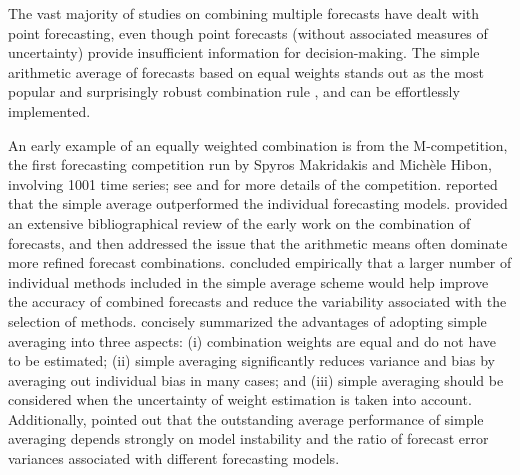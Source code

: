 \documentclass[a4paper,11pt]{article}
\begin{document}
The vast majority of studies on combining multiple forecasts have dealt with point forecasting, even though point forecasts (without associated measures of uncertainty) provide insufficient information for decision-making. The simple arithmetic average of forecasts based on equal weights stands out as the most popular and surprisingly robust combination rule \citep[see][]{Bunn1985-vo,Clemen1986-pd,Stock2003-sp,Genre2013-ut}, and can be effortlessly implemented.

An early example of an equally weighted combination is from the M-competition, the first forecasting competition run by Spyros Makridakis and Mich{\`e}le Hibon, involving 1001 time series; see \citet{Makridakis1982-hb} and \citet{Hyndman2020-bh} for more details of the competition. \citet{Makridakis1982-hb} reported that the simple average outperformed the individual forecasting models. \citet{Clemen1989-fb} provided an extensive bibliographical review of the early work on the combination of forecasts, and then addressed the issue that the arithmetic means often dominate more refined forecast combinations. \citet{Makridakis1983-hg} concluded empirically that a larger number of individual methods included in the simple average scheme would help improve the accuracy of combined forecasts and reduce the variability associated with the selection of methods. \citet{Palm1992-im} concisely summarized the advantages of adopting simple averaging into three aspects: (i) combination weights are equal and do not have to be estimated; (ii) simple averaging significantly reduces variance and bias by averaging out individual bias in many cases; and (iii) simple averaging should be considered when the uncertainty of weight estimation is taken into account. Additionally, \citet{Timmermann2006-en} pointed out that the outstanding average performance of simple averaging depends strongly on model instability and the ratio of forecast error variances associated with different forecasting models.
\end{document}
